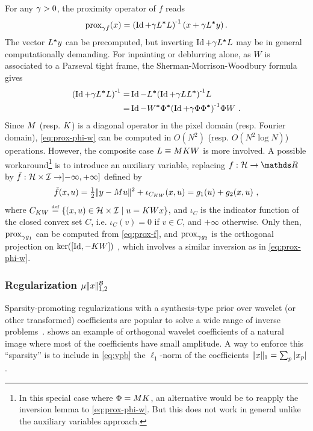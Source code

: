 For any $\gamma > 0$, the proximity operator of $f$ reads 
%
\begin{equation}\label{eq:prox-f}
 \prox_{\ga f}(x) = \inv{\pa{\Id+\ga \adj{L}L}}\pa{x+\ga \adj{L}y}.
\end{equation}
% 
The vector ${L}^{\boldsymbol*}y$ can be precomputed, but inverting $\operatorname{Id}+\gamma {L}^{\boldsymbol*}L$ may be in general computationally demanding. For inpainting or deblurring alone, as $W$ is associated to a Parseval tight frame, the Sherman-Morrison-Woodbury formula gives
%
\begin{align}
  \inv{\pa{\Id+\ga \adj{L}L}} = & \Id - \adj{L} \inv{\pa{\Id+\ga L\adj{L}}} L \nonumber \\
			      = & \Id - \adj{W} \adj{\Phi} \inv{\pa{\Id+\ga \Phi \adj{\Phi} }} \Phi W \label{eq:prox-phi-w}~.
\end{align}
% 
Since $M$ (resp. $K$) is a diagonal operator in the pixel domain (resp. Fourier domain), \eqref{eq:prox-phi-w} can be computed in $O(N^2)$ (resp. $O(N^2 \log N)$) operations. However, the composite case $L \equiv M K W$ is more involved. A possible workaround\footnote{In this special case where $\Phi=M K$, an alternative would be to reapply the inversion lemma to \eqref{eq:prox-phi-w}. But this does not work in general unlike the auxiliary variables approach.} is to introduce an auxiliary variable, replacing $f : \Hh \to \R$ by ${\tilde{f} : \mathcal{H} \times \mathcal{I} \to ]{-}\infty,{+}\infty]}$ defined by
%
\begin{equation}\label{eq:tilde-f}
  \tilde{f}(x,u) = \half \norm{y - \Mr u}^2 + \iota_{C_{\Ks W}}(x,u) = g_1(u) + g_2(x,u) ~,
\end{equation}
% 
where $C_{K W} \stackrel{\mathrm{\scriptscriptstyle{def}}}{=} \left\{  \left( x,u \right) \in \mathcal{H} \times \mathcal{I} \;\middle|\; u = K W x  \right\}$, and $\iota_C$ is the indicator function of the closed convex set $C$, i.e. $\iota_C(v)=0$ if $v \in C$, and $+\infty$ otherwise. Only then, $\operatorname{prox}_{\gamma g_1}$ can be computed from \eqref{eq:prox-f}, and $\operatorname{prox}_{\gamma g_2}$ is the orthogonal projection on ${\operatorname{ker}([\operatorname{Id}, -K W])}$ \cite{Briceno-Arias10,Dupe11b}, which involves a similar inversion as in \eqref{eq:prox-phi-w}.

	\subsubsection{Regularization $\mu |\kern-1pt| x |\kern-1pt|_{1,2}^{\mathcal{B}}$}
	\label{sec:spars-reg}

Sparsity-promoting regularizations with a syn\-thesis-type prior over wavelet (or other transformed) coefficients are popular to solve a wide range of inverse problems~\cite{Mallat99}.  shows an example of orthogonal wavelet coefficients of a natural image where most of the coefficients have small amplitude. A way to enforce this ``sparsity'' is to include in \eqref{eq:vpb} the $\ell_1$-norm of the coefficients $|\kern-1pt| x |\kern-1pt|_1 = \sum_p |x_p|$. 

